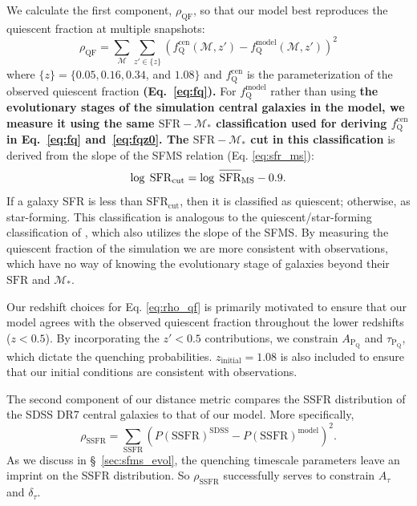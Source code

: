\documentclass[iop,apj,tighten,twocolappendix,numberedappendix]{emulateapj}
\newcommand{\beq}{\begin{equation}}
\newcommand{\eeq}{\end{equation}}
\newcommand{\avgSFR}{\overline{\raisebox{0pt}[1.2\height]{SFR}}}
\newcommand{\fqcen}{f_\mathrm{Q}^\mathrm{cen}}
\newcommand{\zinit}{z_\mathrm{initial}}
\begin{document}
We calculate the first component, $\rho_\mathrm{QF}$, so that our model 
best reproduces the quiescent fraction at multiple snapshots:
\beq \label{eq:rho_qf}
\rho_\mathrm{QF} = \sum\limits_\mathcal{M} \sum\limits_{z' \in \{z\}} 
\left(f^\mathrm{cen}_\mathrm{Q}(\mathcal{M}, z') - f^\mathrm{model}_\mathrm{Q}(\mathcal{M}, z') \right)^2
\eeq
where $\{z\} = \{0.05, 0.16, 0.34$, and $1.08\}$ and $f^\mathrm{cen}_\mathrm{Q}$
is the parameterization of the observed quiescent fraction 
{\bf \color{dred}
(Eq.~\ref{eq:fq}). 
}
For $f^\mathrm{model}_\mathrm{Q}$ rather than using 
{\bf \color{dred} the evolutionary stages of the simulation 
central galaxies in the model, we measure it using the same 
$\mathrm{SFR} - \mathcal{M}_*$ classification used for deriving 
$\fqcen$ in Eq.~\ref{eq:fq} and~\ref{eq:fqz0}. 
The $\mathrm{SFR} - \mathcal{M}_*$ cut in this classification
}
is derived from the slope of the SFMS relation (Eq. \ref{eq:sfr_ms}): 
\beq \label{eq:sfr_cut}
\log\;\mathrm{SFR}_\mathrm{cut} = \log\;\avgSFR_\mathrm{MS} - 0.9. 
\eeq
If a galaxy SFR is less than $\mathrm{SFR}_\mathrm{cut}$, then it is 
classified as quiescent; otherwise, as star-forming. This classification
is analogous to the quiescent/star-forming classification of 
\cite{Moustakas:2013aa}, which also utilizes the slope of the SFMS. By 
measuring the quiescent fraction of the simulation we are more consistent 
with observations, which have no way of knowing the evolutionary stage
of galaxies beyond their $\mathrm{SFR}$ and $\mathcal{M}_*$. 

Our redshift choices for Eq. \ref{eq:rho_qf} is primarily 
motivated to ensure that our model agrees with the observed 
quiescent fraction throughout the lower redshifts ($z < 0.5$). 
By incorporating the $z' < 0.5$ contributions, we constrain 
$A_\mathrm{P_Q}$ and $\tau_\mathrm{P_Q}$, which dictate the 
quenching probabilities. $\zinit=1.08$ is also included to 
ensure that our initial conditions are consistent with observations. 

The second component of our distance metric compares the SSFR distribution 
of the SDSS DR7 central galaxies to that of our model. More specifically, 
\beq \label{eq:rho_ssfr}
\rho_\mathrm{SSFR} = \sum\limits_\mathrm{SSFR} 
\left( P(\mathrm{SSFR})^\mathrm{SDSS} - P(\mathrm{SSFR})^\mathrm{model} \right)^2.
\eeq
As we discuss in \S~\ref{sec:sfms_evol}, the quenching timescale
parameters leave an imprint on the SSFR distribution. So $\rho_\mathrm{SSFR}$ 
successfully serves to constrain $A_\tau$ and $\delta_\tau$. 
\end{document}
